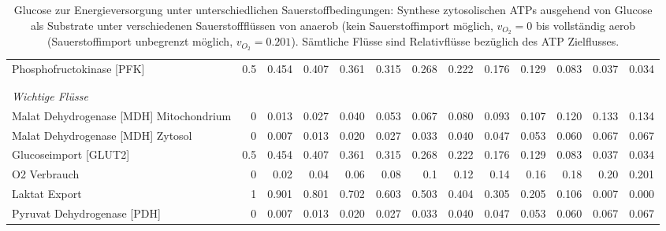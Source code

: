 \begin{landscape}
\begin{table}[htp]
\begin{tabular}{l rrr rrr rrr rrr}
\hspace*{5mm}Phosphofructokinase [PFK] &0.5 & 0.454 & 0.407 & 0.361 & 0.315 & 0.268 & 0.222 & 0.176 & 0.129 & 0.083 & 0.037 & 0.034\\
 &  &  &  &  &  &  &  &  &  &  &  & \\
 &  &  &  &  &  &  &  &  &  &  &  & \\
\textit{Wichtige Flüsse }&  &  &  &  &  &  &  &  &  &  &  & \\
\hspace*{5mm}Malat Dehydrogenase [MDH] Mitochondrium & 0 & 0.013 & 0.027 & 0.040 & 0.053 & 0.067 & 0.080 & 0.093 & 0.107 & 0.120 & 0.133 & 0.134\\
\hspace*{5mm}Malat Dehydrogenase [MDH] Zytosol & 0 & 0.007 & 0.013 & 0.020 & 0.027 & 0.033 & 0.040 & 0.047 & 0.053 & 0.060 & 0.067 & 0.067\\
\hspace*{5mm}Glucoseimport [GLUT2] & 0.5 & 0.454 & 0.407 & 0.361 & 0.315 & 0.268 & 0.222 & 0.176 & 0.129 & 0.083 & 0.037 & 0.034\\
\hspace*{5mm}O2 Verbrauch & 0 & 0.02 & 0.04 & 0.06 & 0.08 & 0.1 & 0.12 & 0.14 & 0.16 & 0.18 & 0.20 & 0.201\\
\hspace*{5mm}Laktat Export & 1 & 0.901 & 0.801 & 0.702 & 0.603 & 0.503 & 0.404 & 0.305 & 0.205 & 0.106 & 0.007 & 0.000\\
\hspace*{5mm}Pyruvat Dehydrogenase [PDH] &0 & 0.007 & 0.013 & 0.020 & 0.027 & 0.033 & 0.040 & 0.047 & 0.053 & 0.060 & 0.067 & 0.067\\
\bottomrule
\end{tabular} 
\caption{Glucose zur Energieversorgung unter unterschiedlichen Sauerstoffbedingungen: Synthese zytosolischen ATPs ausgehend von Glucose als Substrate unter verschiedenen Sauerstoffflüssen von anaerob (kein Sauerstoffimport möglich, $v_{O_2}=0$ bis vollständig aerob (Sauerstoffimport unbegrenzt möglich, $v_{O_2}=0.201$). Sämtliche Flüsse sind Relativflüsse bezüglich des ATP Zielflusses.}
\normalsize
\label{tab: o2_simulation}
\end{table}
\end{landscape}


